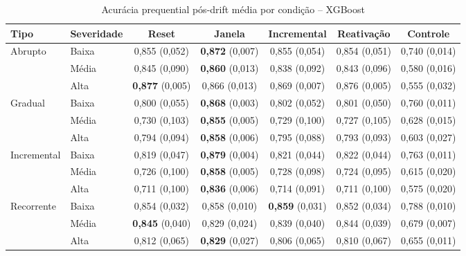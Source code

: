 \begin{table}[htbp]
\centering
\small
\caption{Acurácia prequential pós-drift média por condição -- XGBoost}
\label{tab:acc-xgboost}
\begin{adjustbox}{max width=\textwidth}
\begin{tabular}{llccccc}
\toprule
Tipo & Severidade & Reset & Janela & Incremental & Reativação & Controle \\
\midrule
Abrupto & Baixa & 0,855 (0,052) & \textbf{0,872} (0,007) & 0,855 (0,054) & 0,854 (0,051) & 0,740 (0,014) \\
 & Média & 0,845 (0,090) & \textbf{0,860} (0,013) & 0,838 (0,092) & 0,843 (0,096) & 0,580 (0,016) \\
 & Alta & \textbf{0,877} (0,005) & 0,866 (0,013) & 0,869 (0,007) & 0,876 (0,005) & 0,555 (0,032) \\
Gradual & Baixa & 0,800 (0,055) & \textbf{0,868} (0,003) & 0,802 (0,052) & 0,801 (0,050) & 0,760 (0,011) \\
 & Média & 0,730 (0,103) & \textbf{0,855} (0,005) & 0,729 (0,100) & 0,727 (0,105) & 0,628 (0,015) \\
 & Alta & 0,794 (0,094) & \textbf{0,858} (0,006) & 0,795 (0,088) & 0,793 (0,093) & 0,603 (0,027) \\
Incremental & Baixa & 0,819 (0,047) & \textbf{0,879} (0,004) & 0,821 (0,044) & 0,822 (0,044) & 0,763 (0,011) \\
 & Média & 0,726 (0,100) & \textbf{0,858} (0,005) & 0,728 (0,098) & 0,724 (0,095) & 0,615 (0,020) \\
 & Alta & 0,711 (0,100) & \textbf{0,836} (0,006) & 0,714 (0,091) & 0,711 (0,100) & 0,575 (0,020) \\
Recorrente & Baixa & 0,854 (0,032) & 0,858 (0,010) & \textbf{0,859} (0,031) & 0,852 (0,034) & 0,788 (0,010) \\
 & Média & \textbf{0,845} (0,040) & 0,829 (0,024) & 0,839 (0,040) & 0,844 (0,039) & 0,679 (0,007) \\
 & Alta & 0,812 (0,065) & \textbf{0,829} (0,027) & 0,806 (0,065) & 0,810 (0,067) & 0,655 (0,011) \\
\bottomrule
\end{tabular}
\end{adjustbox}
\par\vspace{2pt}{\footnotesize Média e, entre parênteses, desvio-padrão de 10 repetições. Em negrito, a melhor média de cada linha (excluído o controle).}
\end{table}
